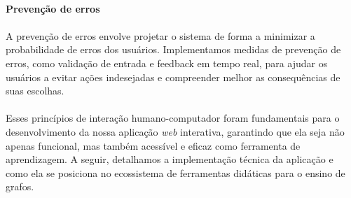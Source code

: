 \documentclass[12pt,a4paper]{article}
\begin{document}
\paragraph{Prevenção de erros}
\paragraph{}
A prevenção de erros envolve projetar o sistema de forma a minimizar a probabilidade de erros dos usuários. Implementamos medidas de prevenção de erros, como validação de entrada e feedback em tempo real, para ajudar os usuários a evitar ações indesejadas e compreender melhor as consequências de suas escolhas.

\paragraph{}
Esses princípios de interação humano-computador foram fundamentais para o desenvolvimento da nossa aplicação \textit{web} interativa, garantindo que ela seja não apenas funcional, mas também acessível e eficaz como ferramenta de aprendizagem. A seguir, detalhamos a implementação técnica da aplicação e como ela se posiciona no ecossistema de ferramentas didáticas para o ensino de grafos.
\end{document}
